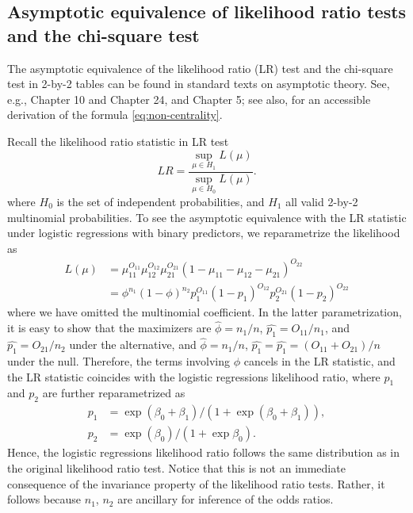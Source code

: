 

\subsection{Asymptotic equivalence of likelihood ratio tests and the chi-square test}
The asymptotic equivalence of the likelihood ratio (LR) test and the chi-square test in 2-by-2 tables can be found in standard texts on asymptotic theory.
See, e.g., \citet{Ferguson17} Chapter 10 and Chapter 24, and \citet{Lehmann04} Chapter 5; see also, \citet{Hunter02} for an accessible derivation of the formula \eqref{eq:non-centrality}.

Recall the likelihood ratio statistic in LR test
\begin{equation*}
    LR = \frac{\sup_{\mu\in H_1}L(\mu)}{\sup_{\mu\in H_0}L(\mu)}.
\end{equation*}
where $H_0$ is the set of independent probabilities, and $H_1$ all valid 2-by-2 multinomial probabilities.
To see the asymptotic equivalence with the LR statistic under logistic regressions with binary predictors, we reparametrize the likelihood as
\begin{align*}
    L(\mu) &= \mu_{11}^{O_{11}}\mu_{12}^{O_{12}}\mu_{21}^{O_{21}}(1-\mu_{11}-\mu_{12}-\mu_{21})^{O_{22}} \\
    &= \phi^{n_1}(1-\phi)^{n_2}p_{1}^{O_{11}}(1-p_{1})^{O_{12}}p_{2}^{O_{21}}(1-p_{2})^{O_{22}}
\end{align*}
where we have omitted the multinomial coefficient.
In the latter parametrization, it is easy to show that the maximizers are $\widehat{\phi} = n_1/n$, $\widehat{p_1} = O_{11}/n_1$, and $\widehat{p_1} = O_{21}/n_2$ under the alternative, and $\widehat{\phi} = n_1/n$, $\widehat{p_1} = \widehat{p_1} = (O_{11}+O_{21})/n$ under the null.
Therefore, the terms involving $\phi$ cancels in the LR statistic, and the LR statistic coincides with the logistic regressions likelihood ratio, where $p_1$ and $p_2$ are further reparametrized as
\begin{align*}
    p_1 &= \exp{(\beta_0+\beta_1)}/(1+\exp{(\beta_0+\beta_1)}), \\
    p_2 &= \exp{(\beta_0)}/(1+\exp{\beta_0}).
\end{align*}
Hence, the logistic regressions likelihood ratio follows the same distribution as in the original likelihood ratio test.
Notice that this is not an immediate consequence of the invariance property of the likelihood ratio tests. Rather, it follows because $n_1$, $n_2$ are ancillary for inference of the odds ratios.

